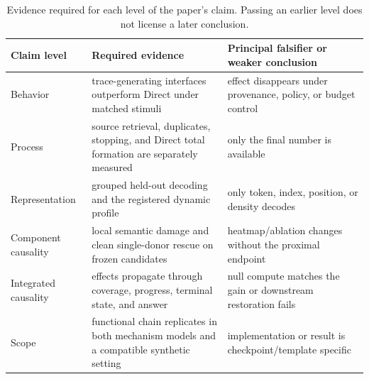 \begin{table}[H]
\centering
\small
\caption{Evidence required for each level of the paper's claim. Passing an
earlier level does not license a later conclusion.}
\label{tab:claim-ladder}
\begin{tabularx}{\textwidth}{@{}P{.18\textwidth}P{.31\textwidth}Y@{}}
\toprule
Claim level & Required evidence & Principal falsifier or weaker conclusion \\
\midrule
Behavior
  & trace-generating interfaces outperform Direct under matched stimuli
  & effect disappears under provenance, policy, or budget control \\
Process
  & source retrieval, duplicates, stopping, and Direct total formation are
  separately measured
  & only the final number is available \\
Representation
  & grouped held-out decoding and the registered dynamic profile
  & only token, index, position, or density decodes \\
Component causality
  & local semantic damage and clean single-donor rescue on frozen candidates
  & heatmap/ablation changes without the proximal endpoint \\
Integrated causality
  & effects propagate through coverage, progress, terminal state, and answer
  & null compute matches the gain or downstream restoration fails \\
Scope
  & functional chain replicates in both mechanism models and a compatible
  synthetic setting
  & implementation or result is checkpoint/template specific \\
\bottomrule
\end{tabularx}
\end{table}
